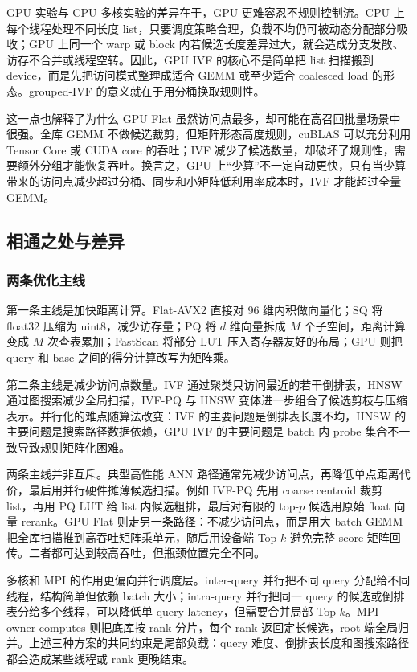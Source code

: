\documentclass[a4paper,11pt,UTF8]{ctexart}
\begin{document}
GPU 实验与 CPU 多核实验的差异在于，GPU 更难容忍不规则控制流。CPU 上每个线程处理不同长度 list，只要调度策略合理，负载不均仍可被动态分配部分吸收；GPU 上同一个 warp 或 block 内若候选长度差异过大，就会造成分支发散、访存不合并或线程空转。因此，GPU IVF 的核心不是简单把 list 扫描搬到 device，而是先把访问模式整理成适合 GEMM 或至少适合 coalesced load 的形态。grouped-IVF 的意义就在于用分桶换取规则性。

这一点也解释了为什么 GPU Flat 虽然访问点最多，却可能在高召回批量场景中很强。全库 GEMM 不做候选裁剪，但矩阵形态高度规则，cuBLAS 可以充分利用 Tensor Core 或 CUDA core 的吞吐；IVF 减少了候选数量，却破坏了规则性，需要额外分组才能恢复吞吐。换言之，GPU 上“少算”不一定自动更快，只有当少算带来的访问点减少超过分桶、同步和小矩阵低利用率成本时，IVF 才能超过全量 GEMM。


\subsection{相通之处与差异}

\subsubsection{两条优化主线}

第一条主线是加快距离计算。Flat-AVX2 直接对 96 维内积做向量化；SQ 将 float32 压缩为 uint8，减少访存量；PQ 将 $d$ 维向量拆成 $M$ 个子空间，距离计算变成 $M$ 次查表累加；FastScan 将部分 LUT 压入寄存器友好的布局；GPU 则把 query 和 base 之间的得分计算改写为矩阵乘。

第二条主线是减少访问点数量。IVF 通过聚类只访问最近的若干倒排表，HNSW 通过图搜索减少全局扫描，IVF-PQ 与 HNSW 变体进一步组合了候选剪枝与压缩表示。并行化的难点随算法改变：IVF 的主要问题是倒排表长度不均，HNSW 的主要问题是搜索路径数据依赖，GPU IVF 的主要问题是 batch 内 probe 集合不一致导致规则矩阵化困难。

两条主线并非互斥。典型高性能 ANN 路径通常先减少访问点，再降低单点距离代价，最后用并行硬件摊薄候选扫描。例如 IVF-PQ 先用 coarse centroid 裁剪 list，再用 PQ LUT 给 list 内候选粗排，最后对有限的 top-$p$ 候选用原始 float 向量 rerank。GPU Flat 则走另一条路径：不减少访问点，而是用大 batch GEMM 把全库扫描推到高吞吐矩阵乘单元，随后用设备端 Top-$k$ 避免完整 score 矩阵回传。二者都可达到较高吞吐，但瓶颈位置完全不同。

多核和 MPI 的作用更偏向并行调度层。inter-query 并行把不同 query 分配给不同线程，结构简单但依赖 batch 大小；intra-query 并行把同一 query 的候选或倒排表分给多个线程，可以降低单 query latency，但需要合并局部 Top-$k$。MPI owner-computes 则把底库按 rank 分片，每个 rank 返回定长候选，root 端全局归并。上述三种方案的共同约束是尾部负载：query 难度、倒排表长度和图搜索路径都会造成某些线程或 rank 更晚结束。
\end{document}
